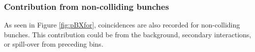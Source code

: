 \subsubsection{Contribution from non-colliding bunches}
As seen in Figure \ref{fig:pBXfor}, coincidences are also recorded for non-colliding bunches. This contribution could be from the background, secondary interactions, or spill-over from preceding bins. 





%
%


